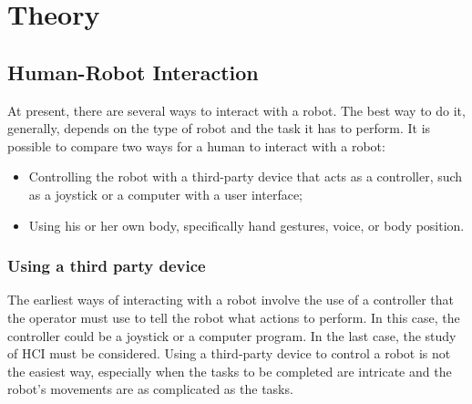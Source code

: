 \documentclass[../thesis.tex]{subfiles}
\begin{document}
\chapter{Theory}\label{cap:theory}

\section{Human-Robot Interaction}
At present, there are several ways to interact with a robot. The best way to do it, generally, depends on the type of robot and the task it has to perform. It is possible to compare two ways for a human to interact with a robot:
\begin{itemize}
    \item Controlling the robot with a third-party device that acts as a controller, such as a joystick or a computer with a user interface;
    \item Using his or her own body, specifically hand gestures, voice, or body position.
\end{itemize}
\subsection{Using a third party device}
The earliest ways of interacting with a robot involve the use of a controller that the operator must use to tell the robot what actions to perform. In this case, the controller could be a joystick or a computer program. In the last case, the study of \acrfull{HCI} must be considered. Using a third-party device to control a robot is not the easiest way, especially when the tasks to be completed are intricate and the robot’s movements are as complicated as the tasks.
\end{document}
